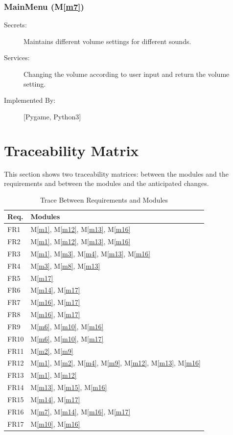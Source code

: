 \documentclass[12pt, titlepage]{article}
\newcommand{\mref}[1]{M\ref{#1}}
\begin{document}
\subsubsection{MainMenu (\mref{m7})}
\begin{description}
\item[Secrets:] Maintains different volume settings for  different sounds. 
\item[Services:] Changing the volume according to user input and return the volume setting.
\item[Implemented By:] [Pygame, Python3]
\end{description}

\section{Traceability Matrix} \label{SecTM}

This section shows two traceability matrices: between the modules and the
requirements and between the modules and the anticipated changes.

\begin{table}[H]
\centering
\begin{tabular}{p{} p{}}
\toprule
\textbf{Req.} & \textbf{Modules}\\
\midrule
FR1 & \mref{m1}, \mref{m12}, \mref{m13}, \mref{m16}\\
FR2 & \mref{m1}, \mref{m12}, \mref{m13}, \mref{m16}\\
FR3 & \mref{m1}, \mref{m3}, \mref{m4}, \mref{m13}, \mref{m16}\\
FR4 & \mref{m3}, \mref{m8}, \mref{m13}\\
FR5 & \mref{m17}\\
FR6 & \mref{m14}, \mref{m17}\\
FR7 & \mref{m16}, \mref{m17}\\
FR8 & \mref{m16}, \mref{m17}\\
FR9 & \mref{m6}, \mref{m10}, \mref{m16}\\
FR10 & \mref{m6}, \mref{m10}, \mref{m17}\\
FR11 & \mref{m2}, \mref{m9}\\
FR12 & \mref{m1}, \mref{m2}, \mref{m4}, \mref{m9}, \mref{m12}, \mref{m13}, \mref{m16}\\
FR13 & \mref{m1}, \mref{m12}\\
FR14 & \mref{m13}, \mref{m15}, \mref{m16}\\
FR15 & \mref{m14}, \mref{m17}\\
FR16 & \mref{m7}, \mref{m14}, \mref{m16}, \mref{m17}\\
FR17 & \mref{m10}, \mref{m16}\\
\bottomrule
\end{tabular}
\caption{Trace Between Requirements and Modules}
\label{TblRT}
\end{table}
\end{document}
